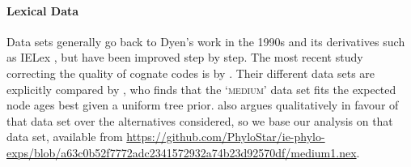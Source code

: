 \documentclass[]{rsos}%
\begin{document}
\paragraph{Lexical Data}
Data sets generally go back to Dyen's work \parencite{dyen1992indoeuropean,dyen1997comparative} in the 1990s and its derivatives such as IELex \parencite{ielex},
but have been improved
step by step. The most recent study correcting
the quality of cognate codes is by \textcite{chang2015ancestryconstrained}. Their different data sets are explicitly compared by \textcite{rama2018three}, who finds that the
‘\textsc{medium}’ data set fits the expected node ages best given a uniform tree prior.  also argues qualitatively in favour of
that data set over the alternatives considered, so we base our analysis on that data set, available from
\url{https://github.com/PhyloStar/ie-phylo-exps/blob/a63c0b52f7772adc2341572932a74b23d92570df/medium1.nex}.
\end{document}
